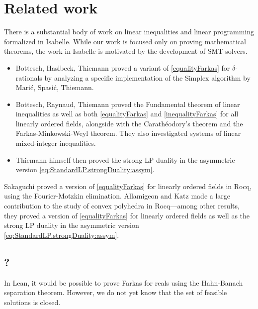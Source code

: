 \documentclass[]{article}
\renewcommand{\.}{\hskip .75pt}
\begin{document}
\section {Related work}

There is a substantial body of work on linear inequalities and
linear programming formalized in Isabelle.
While our work is focused only on proving mathematical theorems,
the work in Isabelle is motivated by the development of SMT solvers.

\begin{itemize}
\item 
Bottesch, Haslbeck, Thiemann \cite{Farkas-AFP} proved a variant of
\ref{equalityFarkas} for $\delta$-rationals
by analyzing a specific implementation of the Simplex algorithm
\cite{Simplex-AFP} by Marić, Spasić, Thiemann.
\item
Bottesch, Raynaud, Thiemann \cite{Linear-AFP} proved
the Fundamental theorem of linear inequalities as well
as both \ref{equalityFarkas} and \ref{inequalityFarkas}
for all linearly ordered fields, alongside with
the Carathéodory’s theorem and the Farkas-Minkowski-Weyl theorem.
They also investigated systems of linear mixed-integer inequalities.
\item 
Thiemann himself \cite{Duality-AFP} then proved the strong LP duality
in the asymmetric version \eqref{eq:StandardLP.strongDuality:assym}.
\end{itemize}

Sakaguchi \cite{Vass-Coq} proved a version of \ref{equalityFarkas}
for linearly ordered fields in Rocq, using the Fourier-Motzkin elimination.
Allamigeon and Katz \cite{Simplex-Coq} made a large contribution to
the study of convex polyhedra in Rocq\:---\:among
other results, they proved a version of \ref{equalityFarkas}
for linearly ordered fields as well as the strong LP duality
in the asymmetric version \eqref{eq:StandardLP.strongDuality:assym}.

\subsection{?}

In Lean, it would be possible to prove Farkas for reals using the
Hahn-Banach separation theorem. However, we do not yet know that
the set of feasible solutions is closed.
\end{document}
